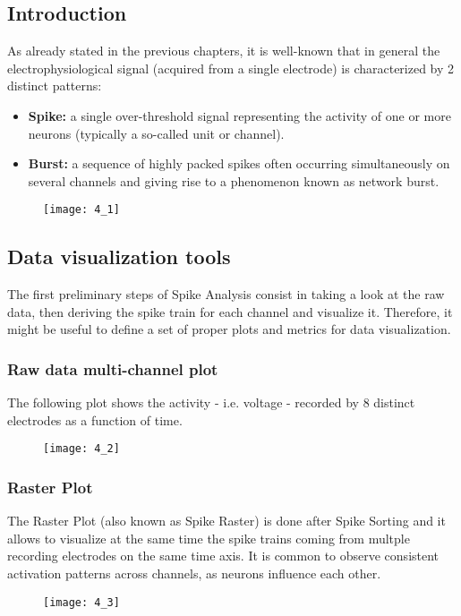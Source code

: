 \subsection{Introduction}
As already stated in the previous chapters, it is well-known that in general the electrophysiological
signal (acquired from a single electrode) is characterized by 2 distinct patterns:
\begin{itemize}
    \item \textbf{Spike:} a single over-threshold signal representing the activity of one or
          more neurons (typically a so-called unit or channel).
    \item \textbf{Burst:} a sequence of highly packed spikes often occurring simultaneously on
          several channels and giving rise to a phenomenon known as network burst.
\end{itemize}
\begin{figure}[H]
    \texttt{[image: 4\_1]}
    \centering
\end{figure}


\subsection{Data visualization tools}
The first preliminary steps of Spike Analysis consist in taking a look at the raw data, then
deriving the spike train for each channel and visualize it. Therefore, it might be useful to define
a set of proper plots and metrics for data visualization.
\subsubsection{Raw data multi-channel plot}
The following plot shows the activity - i.e. voltage - recorded by 8 distinct electrodes as a
function of time.
\begin{figure}[H]
    \texttt{[image: 4\_2]}
    \centering
\end{figure}
\subsubsection{Raster Plot}
The Raster Plot (also known as Spike Raster) is done after Spike Sorting and it allows to visualize
at the same time the spike trains coming from multple recording electrodes on the same time axis.
It is common to observe consistent activation patterns across channels, as neurons influence each
other.
\begin{figure}[H]
    \texttt{[image: 4\_3]}
    \centering
\end{figure}
